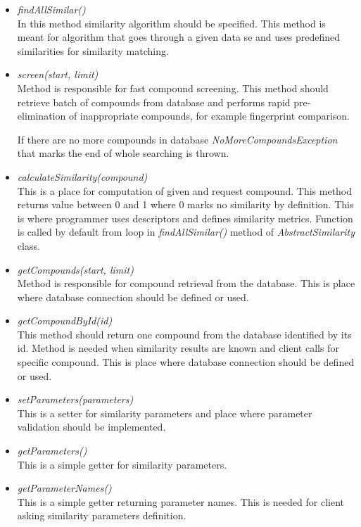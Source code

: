 \documentclass[thesis=M,english]{FITthesis}[2012/10/20]
\begin{document}
\begin{itemize}
\item \textit{findAllSimilar()} \\ In this method similarity algorithm should be specified. This method is meant for algorithm that goes through a given data se and uses predefined similarities for similarity matching.
\item \textit{screen(start, limit)}  \\ Method is responsible for fast compound screening. This method should retrieve batch of compounds from database and performs rapid pre-elimination of inappropriate compounds, for example fingerprint comparison. 

If there are no more compounds in database \textit{NoMoreCompoundsException} that marks the end of whole searching is thrown.

\item \textit{calculateSimilarity(compound)}  \\ This is a place for computation of given and request compound. This method returns value between 0 and 1 where 0 marks no similarity by definition. This is where programmer uses descriptors and defines similarity metrics. Function is called by default from loop in \textit{findAllSimilar()} method of \textit{AbstractSimilarity} class.

\item \textit{getCompounds(start, limit)}  \\ Method is responsible for compound retrieval from the database. This is place where database connection should be defined or used. 

\item \textit{getCompoundById(id)}  \\ This method should return one compound from the database identified by its id. Method is needed when similarity results are known and client calls for specific compound. This is place where database connection should be defined or used.

\item \textit{setParameters(parameters)}  \\ This is a setter for similarity parameters and place where parameter validation should be implemented.

\item \textit{getParameters()}  \\ This is a simple getter for similarity parameters. 

\item \textit{getParameterNames()}  \\ This is a simple getter returning parameter names. This is needed for client asking similarity parameters definition. 


\end{itemize}
\end{document}
